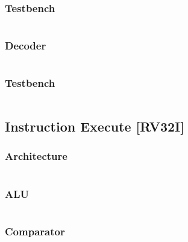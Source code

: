 \subsubsection{Testbench}
\begin{code}
\label{code:IF_TB}
\inputminted[fontsize=\footnotesize]{vhdl}{\simfolder IF_testbench.vhd}
\end{code}
\newpage


\subsubsection{Decoder}
\begin{code}
\label{code:ID_decoder}  
\inputminted[fontsize=\footnotesize]{vhdl}{\srcfolder decoder.vhd}
\end{code}


\subsubsection{Testbench}
\begin{code}
\label{code:ID_TB}  
\inputminted[fontsize=\footnotesize]{vhdl}{\simfolder ID_testbench.vhd}
\end{code}
\newpage


\subsection{Instruction Execute [RV32I]}
\subsubsection{Architecture}
\begin{code}
\label{code:IE_code}  
\inputminted[fontsize=\footnotesize]{vhdl}{\srcfolder instr_exec.vhd}
\end{code}

\subsubsection{ALU}
\begin{code}
\label{code:IE_ALU}  
\inputminted[fontsize=\footnotesize]{vhdl}{\srcfolder ALU.vhd}
\end{code}
\newpage


\subsubsection{Comparator}
\begin{code}
\label{code:IE_comparator}  
\inputminted[fontsize=\footnotesize]{vhdl}{\srcfolder comparator.vhd}
\end{code}
\newpage


